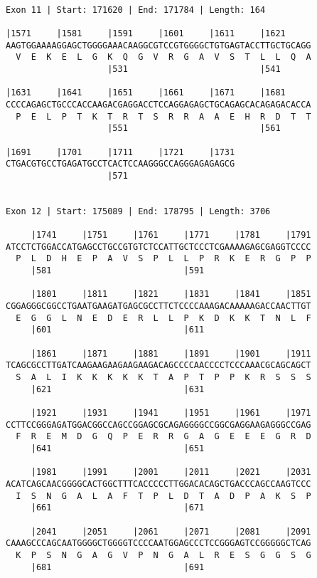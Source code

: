 \documentclass{article}
\begin{document}
\begin{Verbatim}
 
Exon 11 | Start: 171620 | End: 171784 | Length: 164
 
|1571     |1581     |1591     |1601     |1611     |1621     
AAGTGGAAAAGGAGCTGGGGAAACAAGGCGTCCGTGGGGCTGTGAGTACCTTGCTGCAGG
  V  E  K  E  L  G  K  Q  G  V  R  G  A  V  S  T  L  L  Q  A
                    |531                          |541      
  
|1631     |1641     |1651     |1661     |1671     |1681     
CCCCAGAGCTGCCCACCAAGACGAGGACCTCCAGGAGAGCTGCAGAGCACAGAGACACCA
  P  E  L  P  T  K  T  R  T  S  R  R  A  A  E  H  R  D  T  T
                    |551                          |561      
  
|1691     |1701     |1711     |1721     |1731
CTGACGTGCCTGAGATGCCTCACTCCAAGGGCCAGGGAGAGAGCG
                    |571                     
  
 
Exon 12 | Start: 175089 | End: 178795 | Length: 3706
 
     |1741     |1751     |1761     |1771     |1781     |1791
ATCCTCTGGACCATGAGCCTGCCGTGTCTCCATTGCTCCCTCGAAAAGAGCGAGGTCCCC
  P  L  D  H  E  P  A  V  S  P  L  L  P  R  K  E  R  G  P  P
     |581                          |591                     
  
     |1801     |1811     |1821     |1831     |1841     |1851
CGGAGGGCGGCCTGAATGAAGATGAGCGCCTTCTCCCCAAAGACAAAAAGACCAACTTGT
  E  G  G  L  N  E  D  E  R  L  L  P  K  D  K  K  T  N  L  F
     |601                          |611                     
  
     |1861     |1871     |1881     |1891     |1901     |1911
TCAGCGCCTTGATCAAGAAGAAGAAGAAGACAGCCCCAACCCCTCCCAAACGCAGCAGCT
  S  A  L  I  K  K  K  K  K  T  A  P  T  P  P  K  R  S  S  S
     |621                          |631                     
  
     |1921     |1931     |1941     |1951     |1961     |1971
CCTTCCGGGAGATGGACGGCCAGCCGGAGCGCAGAGGGGCCGGCGAGGAAGAGGGCCGAG
  F  R  E  M  D  G  Q  P  E  R  R  G  A  G  E  E  E  G  R  D
     |641                          |651                     
  
     |1981     |1991     |2001     |2011     |2021     |2031
ACATCAGCAACGGGGCACTGGCTTTCACCCCCTTGGACACAGCTGACCCAGCCAAGTCCC
  I  S  N  G  A  L  A  F  T  P  L  D  T  A  D  P  A  K  S  P
     |661                          |671                     
  
     |2041     |2051     |2061     |2071     |2081     |2091
CAAAGCCCAGCAATGGGGCTGGGGTCCCCAATGGAGCCCTCCGGGAGTCCGGGGGCTCAG
  K  P  S  N  G  A  G  V  P  N  G  A  L  R  E  S  G  G  S  G
     |681                          |691                     
  

\end{Verbatim}
\end{document}
